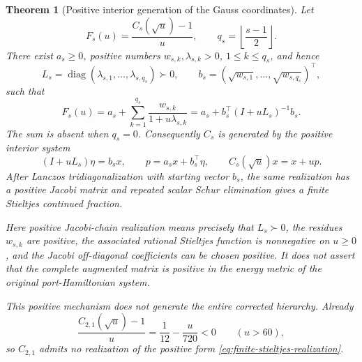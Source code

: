 \documentclass[11pt,a4paper]{article}
\newtheorem{theorem}{Theorem}[section]
\begin{document}
\begin{theorem}[Positive interior generation of the Gauss coordinates]
\label{thm:stieltjes-interior-generation}
Let
\[
 F_s(u)=\frac{C_s(\sqrt u)-1}{u},
 \qquad q_s=\left\lfloor\frac{s-1}{2}\right\rfloor.
\]
There exist \(a_s\ge0\), positive numbers
\(w_{s,k},\lambda_{s,k}>0\), \(1\le k\le q_s\), and hence
\[
 L_s=\operatorname{diag}(\lambda_{s,1},\ldots,\lambda_{s,q_s})\succ0,
 \qquad
 b_s=(\sqrt{w_{s,1}},\ldots,\sqrt{w_{s,q_s}})^\top,
\]
such that
\begin{equation}\label{eq:finite-stieltjes-realization}
 F_s(u)=a_s+\sum_{k=1}^{q_s}
 \frac{w_{s,k}}{1+u\lambda_{s,k}}
 =a_s+b_s^\top(I+uL_s)^{-1}b_s.
\end{equation}
The sum is absent when \(q_s=0\).  Consequently \(C_s\) is generated by
the positive interior system
\begin{equation}\label{eq:positive-coordinate-interior-system}
 (I+uL_s)\eta=b_sx,
 \qquad
 p=a_sx+b_s^\top\eta,
 \qquad
 C_s(\sqrt u)x=x+up.
\end{equation}
After Lanczos tridiagonalization with starting vector \(b_s\), the same
realization has a positive Jacobi matrix and repeated scalar Schur
elimination gives a finite Stieltjes continued fraction.

Here \emph{positive Jacobi-chain realization} means precisely that
\(L_s\succ0\), the residues \(w_{s,k}\) are positive, the associated
rational Stieltjes function is nonnegative on \(u\ge0\), and the Jacobi
off-diagonal coefficients can be chosen positive.  It does not assert
that the complete augmented matrix is positive in the energy metric of
the original port-Hamiltonian system.

This positive mechanism does not generate the entire corrected hierarchy.
Already
\begin{equation}\label{eq:corrected-stieltjes-obstruction}
 \frac{C_{2,1}(\sqrt u)-1}{u}
 =\frac1{12}-\frac{u}{720}<0
 \qquad (u>60),
\end{equation}
so \(C_{2,1}\) admits no realization of the positive form
\cref{eq:finite-stieltjes-realization}.
\end{theorem}
\end{document}
